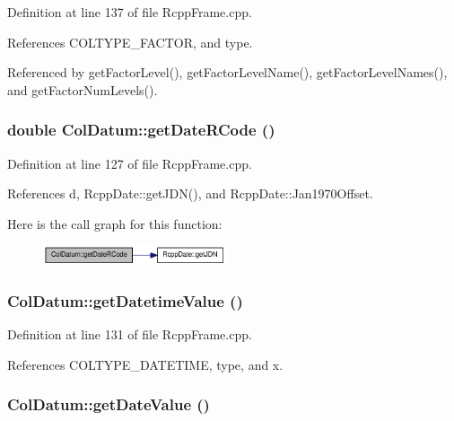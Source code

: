 Definition at line 137 of file RcppFrame.cpp.

References COLTYPE\_\-FACTOR, and type.

Referenced by getFactorLevel(), getFactorLevelName(), getFactorLevelNames(), and getFactorNumLevels().\hypertarget{classColDatum_a87c424137afc43068bf1aba75035851d}{
\subsubsection[{getDateRCode}]{\setlength{\rightskip}{0pt plus 5cm}double ColDatum::getDateRCode ()}}
\label{classColDatum_a87c424137afc43068bf1aba75035851d}


Definition at line 127 of file RcppFrame.cpp.

References d, RcppDate::getJDN(), and RcppDate::Jan1970Offset.

Here is the call graph for this function:\nopagebreak
\begin{figure}[H]
\begin{center}
\leavevmode
\includegraphics[width=153pt]{classColDatum_a87c424137afc43068bf1aba75035851d_cgraph}
\end{center}
\end{figure}
\hypertarget{classColDatum_a408e78096b13b5047ae25e99e945ebf6}{
\subsubsection[{getDatetimeValue}]{ ColDatum::getDatetimeValue ()}}
\label{classColDatum_a408e78096b13b5047ae25e99e945ebf6}


Definition at line 131 of file RcppFrame.cpp.

References COLTYPE\_\-DATETIME, type, and x.\hypertarget{classColDatum_a70480f53f9cee46bcdaed7331e38c943}{
\subsubsection[{getDateValue}]{ ColDatum::getDateValue ()}}
\label{classColDatum_a70480f53f9cee46bcdaed7331e38c943}


